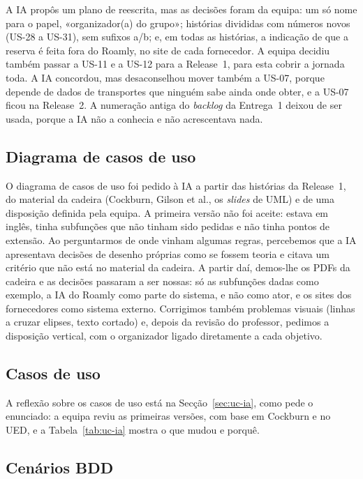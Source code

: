 A IA propôs um plano de reescrita, mas as decisões foram da equipa: um só nome para o papel, «organizador(a) do grupo»;
histórias divididas com números novos (US-28 a US-31), sem sufixos a/b; e, em todas as histórias, a indicação de que a
reserva é feita fora do Roamly, no site de cada fornecedor. A equipa decidiu também passar a US-11 e a US-12 para a
Release~1, para esta cobrir a jornada toda. A IA concordou, mas desaconselhou mover também a US-07, porque depende de dados de
transportes que ninguém sabe ainda onde obter, e a US-07 ficou na Release~2. A numeração antiga do \textit{backlog} da
Entrega~1 deixou de ser usada, porque a IA não a conhecia e não acrescentava nada.

\subsection{Diagrama de casos de uso}

O diagrama de casos de uso foi pedido à IA a partir das histórias da Release~1, do material da cadeira (Cockburn, Gilson et
al., os \textit{slides} de UML) e de uma disposição definida pela equipa. A primeira versão não foi aceite: estava em inglês,
tinha subfunções que não tinham sido pedidas e não tinha pontos de extensão. Ao perguntarmos de onde vinham algumas regras,
percebemos que a IA apresentava decisões de desenho próprias como se fossem teoria e citava um critério que não está no material
da cadeira. A partir daí, demos-lhe os PDFs da cadeira e as decisões passaram a ser nossas: só as subfunções dadas como
exemplo, a IA do Roamly como parte do sistema, e não como ator, e os sites dos fornecedores como sistema externo. Corrigimos
também problemas visuais (linhas a cruzar elipses, texto cortado) e, depois da revisão do professor, pedimos a disposição
vertical, com o organizador ligado diretamente a cada objetivo.

\subsection{Casos de uso}

A reflexão sobre os casos de uso está na Secção~\ref{sec:uc-ia}, como pede o enunciado: a equipa reviu as primeiras versões,
com base em Cockburn e no UED, e a Tabela~\ref{tab:uc-ia} mostra o que mudou e porquê.

\subsection{Cenários BDD}

